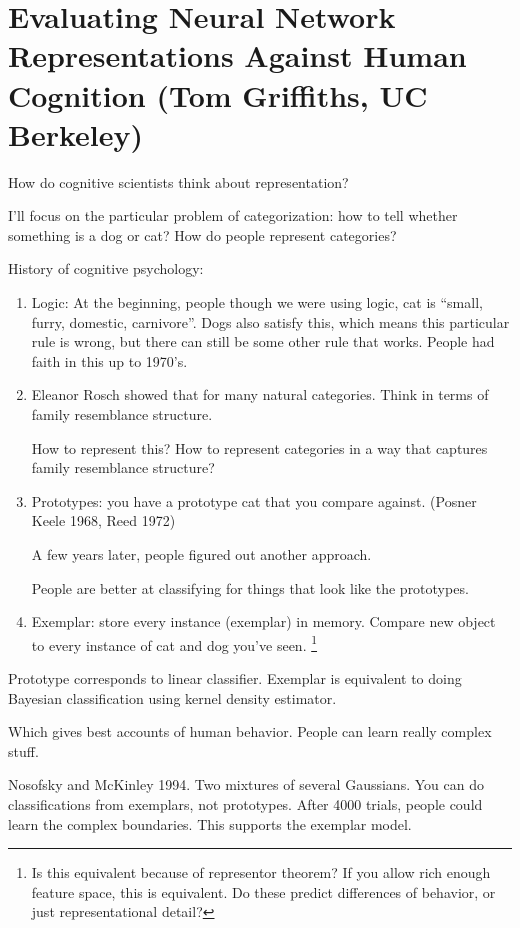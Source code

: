 \section{Evaluating Neural Network Representations Against Human Cognition (Tom Griffiths, UC Berkeley)}

How do cognitive scientists think about representation?

I'll focus on the particular problem of categorization: how to tell whether something is a dog or cat? How do people represent categories?

History of cognitive psychology:
\begin{enumerate}
\item
Logic: At the beginning, people though we were using logic, cat is ``small, furry, domestic, carnivore''. Dogs also satisfy this, which means this particular rule is wrong, but there can still be some other rule that works. People had faith in this up to 1970's. 
\item
Eleanor Rosch showed that for many natural categories. Think in terms of family resemblance structure.

How to represent this? How to represent categories in a way that captures family resemblance structure?
\item
Prototypes: you have a prototype cat that you compare against. (Posner Keele 1968, Reed 1972)

A few years later, people figured out another approach.

People are better at classifying for things that look like the prototypes.
\item
Exemplar: store every instance (exemplar) in memory. Compare new object to every instance of cat and dog you've seen.
\footnote{Is this equivalent because of representor theorem?
If you allow rich enough feature space, this is equivalent.
Do these predict differences of behavior, or just representational detail?}
\end{enumerate}
Prototype corresponds to linear classifier. 
Exemplar is equivalent to doing Bayesian classification using kernel density estimator. 

Which gives best accounts of human behavior.  People can learn really complex stuff. 

Nosofsky and McKinley 1994. Two mixtures of several Gaussians. You can do classifications from exemplars, not prototypes. After 4000 trials, people could learn the complex boundaries. This supports the exemplar model.


